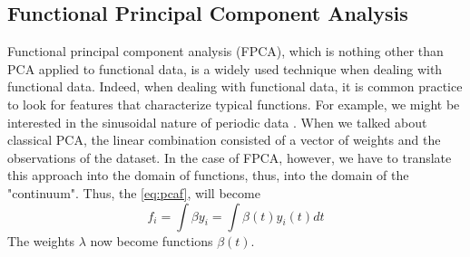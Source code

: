\subsection{Functional Principal Component Analysis}
Functional principal component analysis (FPCA), which is nothing other than PCA applied to functional data, is a widely used technique when dealing with functional data. Indeed, when dealing with functional data, it is common practice to look for features that characterize typical functions. For example, we might be interested in the sinusoidal nature of periodic data \cite{ramsay_functional_2006}. When we talked about classical PCA, the linear combination consisted of a vector of weights and the observations of the dataset. In the case of FPCA, however, we have to translate this approach into the domain of functions, thus, into the domain of the "continuum". Thus, the \ref{eq:pcaf}, will become 
\begin{equation}
    f_i= \int \beta y_i = \int \beta(t) y_i(t) dt
\end{equation}
The weights $\lambda$ now become functions $\beta(t)$. 
